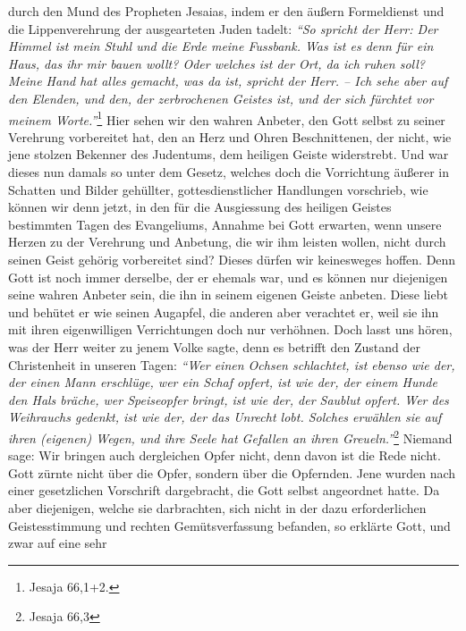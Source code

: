 durch den Mund des Propheten Jesaias, indem er den
äußern Formeldienst und
die Lippenverehrung der ausgearteten Juden tadelt:
\textit{"`So spricht der Herr: Der
Himmel ist mein Stuhl und die Erde meine Fussbank. Was ist es denn für ein
Haus, das ihr mir bauen wollt? Oder welches ist der Ort, da ich ruhen soll?
Meine Hand hat alles gemacht, was da ist, spricht der Herr. -- Ich sehe aber auf
den Elenden, und den, der zerbrochenen Geistes ist, und der sich fürchtet vor
meinem Worte."'}\footnote{Jesaja 66,1+2.}
Hier sehen wir den wahren Anbeter, den
Gott selbst zu seiner Verehrung vorbereitet hat, den an Herz und Ohren
Beschnittenen, der nicht, wie jene stolzen Bekenner des
Judentums, dem
heiligen Geiste widerstrebt. Und war dieses nun damals
so unter dem Gesetz, welches doch die Vorrichtung
äußerer
in Schatten und
Bilder gehüllter, gottesdienstlicher Handlungen vorschrieb, wie können wir denn
jetzt, in den für die Ausgiessung des heiligen Geistes bestimmten Tagen des
Evangeliums, Annahme bei Gott erwarten, wenn unsere Herzen
zu der Verehrung und
Anbetung, die wir ihm leisten wollen, nicht durch seinen Geist gehörig
vorbereitet sind? Dieses dürfen wir keinesweges hoffen. Denn Gott ist noch immer
derselbe, der er ehemals war, und es können nur
diejenigen seine wahren Anbeter sein, die ihn in seinem
eigenen Geiste anbeten.
Diese liebt und behütet er wie seinen Augapfel, die anderen aber verachtet er,
weil sie ihn mit ihren eigenwilligen Verrichtungen doch nur verhöhnen. Doch
lasst uns hören, was der Herr weiter zu jenem Volke sagte, denn es betrifft den
Zustand der Christenheit in unseren Tagen:
\textit{"`Wer einen Ochsen schlachtet, ist
ebenso wie der, der einen Mann erschlüge, wer ein Schaf opfert, ist wie der, der
einem
Hunde den Hals bräche, wer Speiseopfer bringt, ist wie der, der Saublut
opfert. Wer des Weihrauchs gedenkt, ist wie der, der
das Unrecht lobt. Solches erwählen sie auf ihren (eigenen) Wegen, und ihre Seele
hat Gefallen an ihren Greueln."'}\footnote{Jesaja 66,3}
Niemand sage: Wir bringen
auch dergleichen Opfer nicht, denn davon ist die Rede nicht. Gott zürnte nicht
über die Opfer, sondern über die Opfernden. Jene wurden nach einer gesetzlichen
Vorschrift dargebracht, die Gott selbst angeordnet hatte. Da aber diejenigen,
welche sie darbrachten, sich nicht in der dazu erforderlichen Geistesstimmung
und rechten Gemütsverfassung befanden, so erklärte Gott, und zwar auf eine sehr
